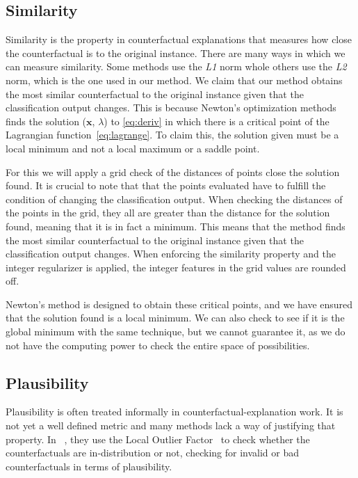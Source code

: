 \documentclass[12pt]{extarticle}
\numberwithin{equation}{section}
\begin{document}
\subsection{Similarity}\label{sec:similarity}
Similarity is the property in counterfactual explanations that measures how close the counterfactual is to the original instance. There are many ways in which we can measure similarity. Some methods use the \emph{L1} norm whole others use the \emph{L2} norm, which is the one used in our method. We claim that our method obtains the most similar counterfactual to the original instance given that the classification output changes. This is because Newton's optimization methods finds the solution ($\mathbf{x}$, $\lambda$) to \eqref{eq:deriv} in which there is a critical point of the Lagrangian function~\eqref{eq:lagrange}. To claim this, the solution given must be a local minimum and not a local maximum or a saddle point. 

For this we will apply a grid check of the distances of points close the solution found. It is crucial to note that that the points evaluated have to fulfill the condition of changing the classification output. When checking the distances of the points in the grid, they all are greater than the distance for the solution found, meaning that it is in fact a minimum. This means that the method finds the most similar counterfactual to the original instance given that the classification output changes. When enforcing the similarity property and the integer regularizer is applied, the integer features in the grid values are rounded off.

Newton's method is designed to obtain these critical points, and we have ensured that the solution found is a local minimum. We can also check to see if it is the global minimum with the same technique, but we cannot guarantee it, as we do not have the computing power to check the entire space of possibilities.

\subsection{Plausibility}\label{sec:plausibility}
Plausibility is often treated informally in counterfactual-explanation work. It is not yet a well defined metric and many methods lack a way of justifying that property. In ~\cite{plausibility}, they use the Local Outlier Factor~\cite{lof} to check whether the counterfactuals are in-distribution or not, checking for invalid or bad counterfactuals in terms of plausibility.
\end{document}
